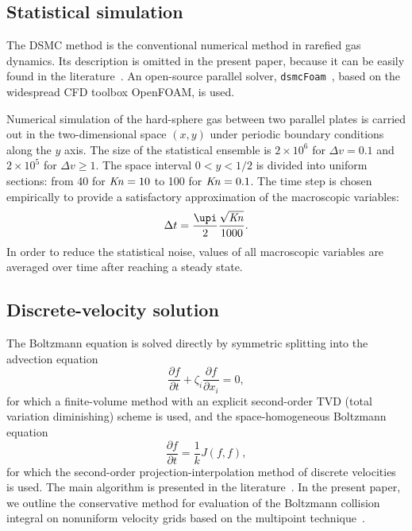 \documentclass[final]{jfm} %
\newcommand{\Kn}{\mbox{\textit{Kn}}}
\newcommand{\pder}[2][]{\frac{\partial#1}{\partial#2}}
\begin{document}
\subsection{Statistical simulation}

The DSMC method is the conventional numerical method in rarefied gas dynamics.
Its description is omitted in the present paper,
because it can be easily found in the literature~\citep[see e.g.][]{Bird1994, Sone2007}.
An open-source parallel solver, \verb+dsmcFoam+~\citep{Reese2010},
based on the widespread CFD toolbox OpenFOAM\textregistered{}, is used.

Numerical simulation of the hard-sphere gas between two parallel plates is carried out
in the two-dimensional space \((x,y)\) under periodic boundary conditions along the \(y\) axis.
The size of the statistical ensemble is \(2\times10^6\) for \(\Delta{v}=0.1\)
and \(2\times10^5\) for \(\Delta{v}\ge1\).
The space interval \(0<y<1/2\) is divided into uniform sections:
from 40 for \(\Kn=10\) to 100 for \(\Kn=0.1\).
The time step is chosen empirically to provide a satisfactory approximation of the macroscopic variables:
\begin{equation}\label{eq:dsmc_timestep}
    \Delta{t} = \frac{\upi}2 \frac{\sqrt{\Kn}}{1000}.
\end{equation}
In order to reduce the statistical noise, values of all macroscopic variables
are averaged over time after reaching a steady state.

\subsection{Discrete-velocity solution}

The Boltzmann equation is solved directly by symmetric splitting
into the advection equation
\begin{equation}\label{eq:split_advection}
    \pder[f]{t} + \zeta_i\pder[f]{x_i} = 0,
\end{equation}
for which a finite-volume method with an explicit second-order TVD (total variation diminishing) scheme is used,
and the space-homogeneous Boltzmann equation
\begin{equation}\label{eq:split_collisions}
    \pder[f]{t} = \frac1k J(f,f),
\end{equation}
for which the second-order projection-interpolation method of discrete velocities is used.
The main algorithm is presented in the literature~\citep[see e.g.][]{Tcheremissine1998, Tcheremissine2006, Dodulad2015}.
In the present paper, we outline the conservative method for evaluation of the Boltzmann collision integral
on nonuniform velocity grids based on the multipoint technique~\citep{Dodulad2012}.
\end{document}
